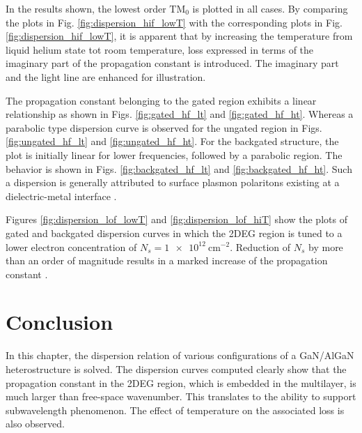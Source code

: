 In the results shown, the lowest order $\text{TM}_0$ is plotted in all cases. By comparing the plots in Fig. \ref{fig:dispersion_hif_lowT} with the corresponding plots in Fig. \ref{fig:dispersion_hif_lowT}, it is apparent that by increasing the temperature from liquid helium state tot room temperature, loss expressed in terms of the imaginary part of the propagation constant is introduced. The imaginary part and the light line are enhanced for illustration.

The propagation constant belonging to the gated region exhibits a linear relationship \cite{Sydoruk2015,Ando1982} as shown in Figs. \ref{fig:gated_hf_lt} and \ref{fig:gated_hf_ht}. Whereas a parabolic type dispersion curve is observed for the ungated region in Figs. \ref{fig:ungated_hf_lt} and \ref{fig:ungated_hf_ht}. For the backgated structure, the plot is initially linear for lower frequencies, followed by a parabolic region. The behavior is shown in Figs. \ref{fig:backgated_hf_lt} and
\ref{fig:backgated_hf_ht}. Such a dispersion is generally attributed to surface plasmon polaritons existing at a dielectric-metal interface \cite{Yoon2014}.

Figures \ref{fig:dispersion_lof_lowT} and \ref{fig:dispersion_lof_hiT} show the plots of gated and backgated dispersion curves in which the 2DEG region is tuned to a lower electron concentration of $N_s = \SI{1e12}{\cm^{-2}}$. Reduction of $N_s$ by more than an order of magnitude results in a marked increase of the propagation constant \cite{Sydoruk2015a}.
\section{Conclusion}
%
In this chapter, the dispersion relation of various configurations of a GaN/AlGaN heterostructure is solved. The dispersion curves computed clearly show that the propagation constant in the 2DEG region, which is embedded in the multilayer, is much larger than free-space wavenumber. This translates to the ability to support subwavelength phenomenon. The effect of temperature on the  associated loss is also observed.

% 
% 
%
% 
